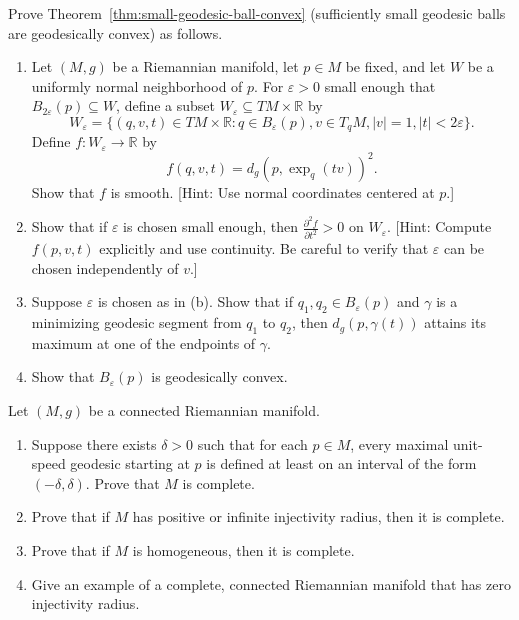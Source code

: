 \begin{exercise}
\label{prob:geodesic-ball-convexity}

Prove Theorem~\ref{thm:small-geodesic-ball-convex} (sufficiently small geodesic balls are geodesically convex) as follows.
\begin{enumerate}
\item[(a)] Let $(M,g)$ be a Riemannian manifold, let $p \in M$ be fixed, and let $W$ be a uniformly normal neighborhood of $p$. For $\varepsilon > 0$ small enough that $B_{2\varepsilon}(p) \subseteq W$, define a subset $W_\varepsilon \subseteq TM \times \mathbb{R}$ by
\[
W_\varepsilon = \{(q, v, t) \in TM \times \mathbb{R} : q \in B_\varepsilon(p), v \in T_q M, |v| = 1, |t| < 2\varepsilon\}.
\]
Define $f: W_\varepsilon \to \mathbb{R}$ by
\[
f(q, v, t) = d_g(p, \exp_q(tv))^2.
\]
Show that $f$ is smooth. [Hint: Use normal coordinates centered at $p$.]
\item[(b)] Show that if $\varepsilon$ is chosen small enough, then $\frac{\partial^2 f}{\partial t^2} > 0$ on $W_\varepsilon$. [Hint: Compute $f(p, v, t)$ explicitly and use continuity. Be careful to verify that $\varepsilon$ can be chosen independently of $v$.]
\item[(c)] Suppose $\varepsilon$ is chosen as in (b). Show that if $q_1, q_2 \in B_\varepsilon(p)$ and $\gamma$ is a minimizing geodesic segment from $q_1$ to $q_2$, then $d_g(p, \gamma(t))$ attains its maximum at one of the endpoints of $\gamma$.
\item[(d)] Show that $B_\varepsilon(p)$ is geodesically convex.
\end{enumerate}
\end{exercise}

\begin{exercise}
\label{prob:geodesic-completeness}

Let $(M, g)$ be a connected Riemannian manifold.
\begin{enumerate}
\item[(a)] Suppose there exists $\delta > 0$ such that for each $p \in M$, every maximal unit-speed geodesic starting at $p$ is defined at least on an interval of the form $(-\delta, \delta)$. Prove that $M$ is complete.
\item[(b)] Prove that if $M$ has positive or infinite injectivity radius, then it is complete.
\item[(c)] Prove that if $M$ is homogeneous, then it is complete.
\item[(d)] Give an example of a complete, connected Riemannian manifold that has zero injectivity radius.
\end{enumerate}
\end{exercise}

